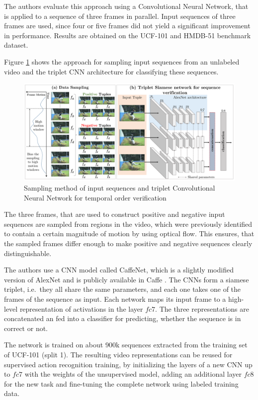 The authors evaluate this approach using a Convolutional Neural Network, that is applied to a sequence of three frames in parallel.
Input sequences of three frames are used, since four or five frames did not yield a significant improvement in performance.
Results are obtained on the UCF-101 and HMDB-51 benchmark dataset.

Figure \ref{fig:shufflelearn_approach} shows the approach for sampling input sequences from an unlabeled video and the triplet CNN architecture for classifying these sequences.

\begin{figure}[H]
    \centering
    \includegraphics[width=\textwidth]{img_deep/shufflelearn_approach}
    \caption{Sampling method of input sequences and triplet Convolutional Neural Network for temporal order verification \cite{misra_shuffle_2016}}
    \label{fig:shufflelearn_approach}
\end{figure}

The three frames, that are used to construct positive and negative input sequences are sampled from regions in the video, which were previously identified to contain a certain magnitude of motion by using optical flow.
This ensures, that the sampled frames differ enough to make positive and negative sequences clearly distinguishable.

The authors use a CNN model called CaffeNet, which is a slightly modified version of AlexNet \cite{krizhevsky_imagenet_2012-1} and is publicly available in Caffe \cite{jia_caffe:_2014}. 
The CNNs form a siamese triplet, i.e.\ they all share the same parameters, and each one takes one of the frames of the sequence as input.
Each network maps its input frame to a high-level representation of activations in the layer $fc7$.
The three representations are concatenated an fed into a classifier for predicting, whether the sequence is in correct or not.

The network is trained on about $900$k sequences extracted from the training set of UCF-101 (split 1).
The resulting video representations can be reused for supervised action recognition training, by initializing the layers of a new CNN up to $fc7$ with the weights of the unsupervised model, adding an additional layer $fc8$ for the new task and fine-tuning the complete network using labeled training data.

